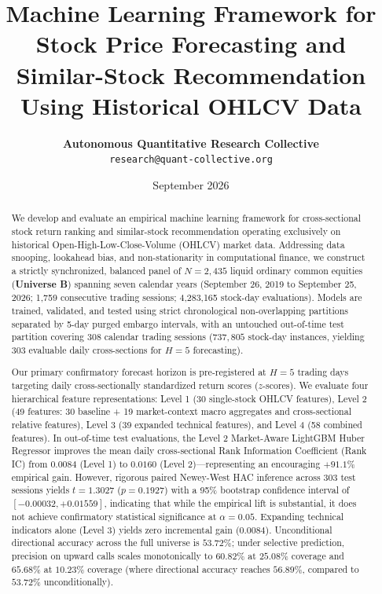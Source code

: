 \documentclass[11pt,a4paper]{article}
\title{\textbf{Machine Learning Framework for Stock Price Forecasting and Similar-Stock Recommendation Using Historical OHLCV Data}}
\author{
  \textbf{Autonomous Quantitative Research Collective} \\
  \texttt{research@quant-collective.org}
}
\date{September 2026}
\begin{document}
\maketitle

\begin{abstract}
We develop and evaluate an empirical machine learning framework for cross-sectional stock return ranking and similar-stock recommendation operating exclusively on historical Open-High-Low-Close-Volume (OHLCV) market data. Addressing data snooping, lookahead bias, and non-stationarity in computational finance, we construct a strictly synchronized, balanced panel of $N = 2,435$ liquid ordinary common equities (\textbf{Universe B}) spanning seven calendar years (September 26, 2019 to September 25, 2026; 1,759 consecutive trading sessions; 4,283,165 stock-day evaluations). Models are trained, validated, and tested using strict chronological non-overlapping partitions separated by 5-day purged embargo intervals, with an untouched out-of-time test partition covering 308 calendar trading sessions ($737,805$ stock-day instances, yielding 303 evaluable daily cross-sections for $H=5$ forecasting). 

Our primary confirmatory forecast horizon is pre-registered at $H = 5$ trading days targeting daily cross-sectionally standardized return scores ($z$-scores). We evaluate four hierarchical feature representations: Level 1 (30 single-stock OHLCV features), Level 2 (49 features: 30 baseline + 19 market-context macro aggregates and cross-sectional relative features), Level 3 (39 expanded technical features), and Level 4 (58 combined features). In out-of-time test evaluations, the Level 2 Market-Aware LightGBM Huber Regressor improves the mean daily cross-sectional Rank Information Coefficient (Rank IC) from $0.0084$ (Level 1) to $0.0160$ (Level 2)---representing an encouraging $+91.1\%$ empirical gain. However, rigorous paired Newey-West HAC inference across 303 test sessions yields $t = 1.3027$ ($p = 0.1927$) with a 95\% bootstrap confidence interval of $[-0.00032, +0.01559]$, indicating that while the empirical lift is substantial, it does not achieve confirmatory statistical significance at $\alpha = 0.05$. Expanding technical indicators alone (Level 3) yields zero incremental gain ($0.0084$). Unconditional directional accuracy across the full universe is $53.72\%$; under selective prediction, precision on upward calls scales monotonically to $60.82\%$ at $25.08\%$ coverage and $65.68\%$ at $10.23\%$ coverage (where directional accuracy reaches $56.89\%$, compared to $53.72\%$ unconditionally).


\end{abstract}
\end{document}
